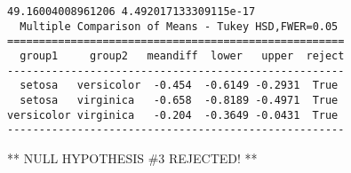 \documentclass[11pt]{article}
\begin{document}
    \begin{Verbatim}[commandchars=\\\{\}]
49.16004008961206 4.492017133309115e-17
  Multiple Comparison of Means - Tukey HSD,FWER=0.05 
=====================================================
  group1     group2   meandiff  lower   upper  reject
-----------------------------------------------------
  setosa   versicolor  -0.454  -0.6149 -0.2931  True 
  setosa   virginica   -0.658  -0.8189 -0.4971  True 
versicolor virginica   -0.204  -0.3649 -0.0431  True 
-----------------------------------------------------

    \end{Verbatim}

    ** NULL HYPOTHESIS \#3 REJECTED! **


    
    
    
    
\end{document}
